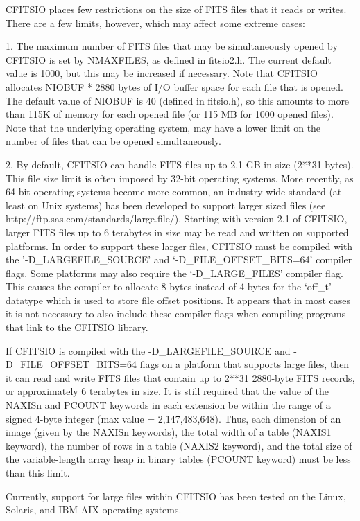 \documentclass[11pt]{book}
\begin{document}
CFITSIO places few restrictions on the size of FITS files that it
reads or writes.  There are a few limits, however, which may affect
some extreme cases:

1.  The maximum number of FITS files that may be simultaneously opened by
CFITSIO is set by NMAXFILES, as defined in fitsio2.h.  The current default
value is 1000, but this may be increased if necessary. Note that CFITSIO
allocates NIOBUF * 2880 bytes of I/O buffer space for each file that is
opened.  The default value of NIOBUF is 40 (defined in fitsio.h), so this
amounts to  more than 115K of memory  for each opened file (or 115 MB for
1000 opened files).  Note that the underlying  operating system, may have a
lower limit on the number of files that can be opened simultaneously.

2.  By default, CFITSIO can handle FITS files up to 2.1 GB in size (2**31
bytes).  This file size limit is often imposed by 32-bit operating
systems.  More recently, as 64-bit operating systems become more common, an
industry-wide standard (at least on Unix systems) has been developed to
support larger sized files (see http://ftp.sas.com/standards/large.file/).
Starting with version 2.1 of CFITSIO, larger FITS files up to 6 terabytes
in size may be read and written on supported platforms.  In order
to support these larger files, CFITSIO must be compiled with the
'-D\_LARGEFILE\_SOURCE' and `-D\_FILE\_OFFSET\_BITS=64' compiler flags.
Some platforms may also require the `-D\_LARGE\_FILES' compiler flag.
 This causes the compiler to allocate 8-bytes instead of
4-bytes for the `off\_t' datatype which is used to store file offset
positions.  It appears that in most cases it is not necessary to
also include these compiler flags when compiling programs that link to
the CFITSIO library.

If CFITSIO is compiled with the -D\_LARGEFILE\_SOURCE
and -D\_FILE\_OFFSET\_BITS=64 flags on a
platform that supports large files, then it can read and write FITS
files that contain up to 2**31 2880-byte FITS records, or approximately
6 terabytes in size.  It is still required that the value of the NAXISn
and PCOUNT keywords in each extension be within the range of a signed
4-byte integer (max value = 2,147,483,648).  Thus, each dimension of an
image (given by the NAXISn keywords), the total width of a table
(NAXIS1 keyword), the number of rows in a table (NAXIS2 keyword), and
the total size of the variable-length array heap in binary tables
(PCOUNT keyword) must be less than this limit.

Currently, support for large files within CFITSIO has been tested
on the Linux, Solaris, and IBM AIX operating systems.
\end{document}
